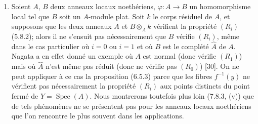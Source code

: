 \begin{remarks}[6.5.5]
\label{IV.2.s6.5.5-fr}
\medskip\noindent
\begin{enumerate}
\item[(i)] Soient $A$, $B$ deux anneaux locaux noethériens,
$\varphi:A\to B$ un homomorphisme local tel que $B$ soit un $A$-module
plat. Soit $k$ le corps résiduel de $A$, et supposons que les deux anneaux
$A$ et $B\otimes_Ak$ vérifient la propriété $(R_i)$ (5.8.2); alors il ne
s'ensuit pas nécessairement que $B$ vérifie $(R_i)$, même dans le cas
particulier où $i=0$ ou $i=1$ et où $B$ est le complété $\widehat A$ de
$A$. Nagata a en effet donné un exemple où $A$ est normal (donc vérifie
$(R_1)$) mais où $\widehat A$ n'est même pas réduit (donc ne vérifie pas
$(R_0)$) [30]. On ne peut appliquer à ce cas la proposition (6.5.3)
parce que les fibres $f^{-1}(y)$ ne vérifient pas nécessairement la
propriété $(R_i)$ aux points distincts du point fermé de $Y=\operatorname{Spec}(A)$.
Nous montrerons toutefois plus loin (7.8.3, (v)) que de tels phénomènes
ne se présentent pas pour les anneaux locaux noethériens que l'on rencontre
le plus souvent dans les applications.


\end{enumerate}
\end{remarks}

